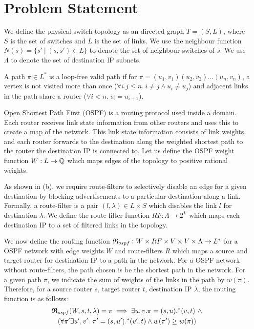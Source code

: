 \section{Problem Statement}
We define the physical switch topology as an directed graph $T=(S, L)$,
where $S$ is the set of switches and $L$ is the set of links. 
We use the neighbour function $N(s) = \{s'\ | \ (s,s') \in L \}$ to denote 
the set of neighbour switches of $s$. 
We use $\Lambda$ to denote the set of destination IP subnets.

A path $\pi \in L^*$ is a loop-free valid path if for 
$\pi = (u_1,v_1) (u_2, v_2) \ldots (u_n, v_n)$, a 
vertex is not visited more than once ($\forall i.j \leq n. 
~i \not= j \wedge u_i \not= u_j$) and adjacent links in the
path share a router ($\forall i < n. ~v_i = u_{i+1}$).

Open Shortest Path First (OSPF) is a routing protocol used inside a
domain. Each router receives link state information from other routers
and uses this to create a map of the network. This link state
information consists of link weights, and each router
forwards to the destination along the weighted shortest path 
to the router the destination IP is connected to. Let us
define the OSPF weight function $W: L \rightarrow \mathbb{Q}$ which 
maps edges of the topology to positive rational weights. 

As shown in (b), 
we require route-filters
to selectively disable an
edge for a given destination by  
blocking advertisements to a
particular destination along a link. 
Formally, a route-filter is a pair $(l,\lambda)\in L\times S$
which disables the link $l$ for destination $\lambda$. 
We define the route-filter function 
$RF: \Lambda \rightarrow 2^L$ which maps each destination IP
to a set of filtered links in the topology. 

We now define the routing function 
$\mathfrak{R}_{ospf}: W \times RF \times V \times V \times \Lambda \rightarrow L^*$ 
for a OSPF network with edge weights $W$ and route-filters
$R$ which maps a source and target router
for destination IP to a path in the network. For a 
OSPF network without route-filters, the path chosen is
be the shortest path in the network. 
For a given
path $\pi$, we indicate the sum of weights of the
links in the path by $w(\pi)$. Therefore, for a
source router $s$, target router $t$, destination IP 
$\lambda$, the routing function is as follows:
\begin{multline}
	\mathfrak{R}_{ospf}(W,s,t,\lambda) = \pi \implies \exists u,v. \pi=(s,u).^*(v,t) ~\wedge\\ 
	(\forall \pi' \exists u',v'. ~\pi'=(s,u').^*(v',t) \wedge w(\pi') \geq w(\pi))
\end{multline}

